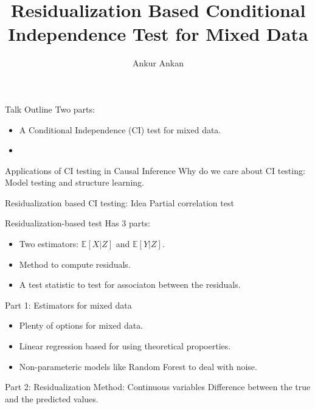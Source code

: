 \documentclass{beamer}
\begin{document}
\title[]{Residualization Based Conditional Independence Test for Mixed Data}
\author {Ankur Ankan}
\date{}

\maketitle

\begin{frame}{Talk Outline}
	Two parts:
	\begin{itemize}
		\item A Conditional Independence (CI) test for mixed data.
		\item 
	\end{itemize}
\end{frame}

\begin{frame}{Applications of CI testing in Causal Inference}
	Why do we care about CI testing: Model testing and structure learning.
\end{frame}

\begin{frame}{Residualization based CI testing: Idea}
	\center Partial correlation test
\end{frame}

\begin{frame}{Residualization-based test}
	Has $ 3 $ parts:
	\begin{itemize}
		\item Two estimators: $ \mathbb{E}[X | Z] $ and $ \mathbb{E}[Y | Z] $.
		\item Method to compute residuals.
		\item A test statistic to test for associaton between the residuals.
	\end{itemize}
\end{frame}

\begin{frame}{Part 1: Estimators for mixed data}
	\begin{itemize}
		\item Plenty of options for mixed data.
		\item Linear regression based for using theoretical propoerties.
		\item Non-parameteric models like Random Forest to deal with noise.
	\end{itemize}
\end{frame}

\begin{frame}{Part 2: Residualization Method: Continuous variables}
	Difference between the true and the predicted values.
\end{frame}
\end{document}
